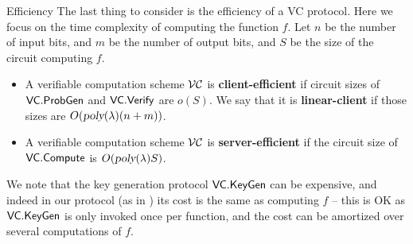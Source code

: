 \medskip
\noindent
{\sc Efficiency}
The last thing to consider is the efficiency of a VC protocol. Here we focus on the time complexity of computing the function $f$. Let $n$ be the number of input bits, and $m$ be the number of output bits, and $S$ be the size of the circuit computing $f$. 
     \begin{itemize}
        \item A verifiable computation scheme ${\cal VC}$ is \textbf{client-efficient} if circuit sizes of $\mathsf{VC.ProbGen}$ and $\mathsf{VC.Verify}$ are $o(S)$. We say that it is \textbf{linear-client} if those sizes are $O({\textsl{poly}}(\lambda)(n + m))$. 
        
        \item A verifiable computation scheme ${\cal VC}$ is \textbf{server-efficient} if the circuit size of $\mathsf{VC.Compute}$ is $O({\textsl{poly}}(\lambda)S)$.
     \end{itemize}
We note that the key generation protocol $\mathsf{VC.KeyGen}$ can be expensive, and indeed in our protocol (as in \cite{ggp10,ckv10,aik10}) its cost is the same as computing $f$ -- this is OK as $\mathsf{VC.KeyGen}$ is only invoked once per function, and the cost can be amortized over several computations of $f$. 
